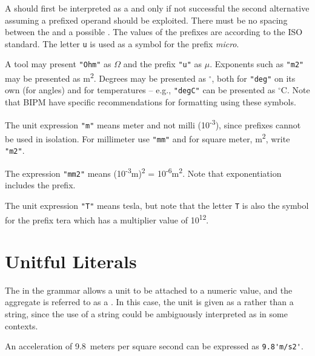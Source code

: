 A  should first be interpreted as a  and only if not successful the second alternative assuming a prefixed operand should be exploited.
There must be no spacing between the  and a possible .
The values of the prefixes are according to the ISO standard.
The letter \lstinline!u! is used as a symbol for the prefix \emph{micro}.

\begin{nonnormative}
A tool may present \lstinline!"Ohm"! as $\Omega$ and the prefix \lstinline!"u"! as $\mu$.
Exponents such as \lstinline!"m2"! may be presented as m\textsuperscript{2}.
Degrees may be presented as $^{\circ}$, both for \lstinline!"deg"! on its own (for angles) and for temperatures -- e.g., \lstinline!"degC"! can be presented as $^{\circ}$C.
Note that BIPM have specific recommendations for formatting using these symbols.
\end{nonnormative}

\begin{example}
The unit expression \lstinline!"m"! means meter and not milli (10\textsuperscript{-3}), since prefixes cannot be used in isolation.
For millimeter use \lstinline!"mm"! and for square meter, m\textsuperscript{2}, write \lstinline!"m2"!.

The expression \lstinline!"mm2"! means (10\textsuperscript{-3}m)\textsuperscript{2} = 10\textsuperscript{-6}m\textsuperscript{2}.
Note that exponentiation includes the prefix.

The unit expression \lstinline!"T"! means tesla, but note that the letter \lstinline!T! is also the symbol for the prefix tera which has a multiplier value of 10\textsuperscript{12}.
\end{example}


\section{Unitful Literals}\label{unitful-literals}

The  in the grammar allows a unit to be attached to a numeric value, and the aggregate is referred to as a .
In this case, the unit is given as a  rather than a string, since the use of a string could be ambiguously interpreted as  in some contexts.

\begin{example}
An acceleration of 9.8~meters per square second can be expressed as \lstinline!9.8'm/s2'!.
\end{example}

